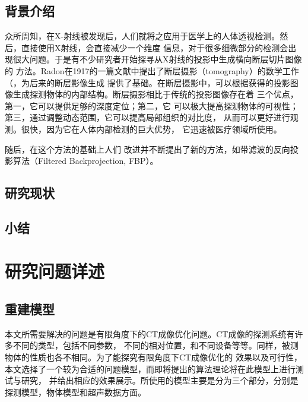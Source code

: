 \section{背景介绍}
众所周知，在X-射线被发现后，人们就将之应用于医学上的人体透视检测。然后，直接使用X射线，会直接减少一个维度
信息，对于很多细微部分的检测会出现很大问题。于是有不少研究者开始探寻从X射线的投影中生成横向断层切片图像的
方法。Radon在1917的一篇文献中提出了断层摄影（tomography）的数学工作（\cite{radon1986}，为后来的断层影像生成
提供了基础。在断层摄影中，可以根据获得的投影图像生成探测物体的内部结构。断层摄影相比于传统的投影图像存在着
三个优点，第一，它可以提供足够的深度定位；第二，它
可以极大提高探测物体的可视性；第三，通过调整动态范围，它可以提高局部组织的对比度，
从而可以更好进行观测。很快，因为它在人体内部检测的巨大优势，
它迅速被医疗领域所使用\cite{dobbins2003digital}。

随后，在这个方法的基础上人们
改进并不断提出了新的方法，如带滤波的反向投影算法（Filtered Backprojection, FBP）\cite{kak1979computerized}。
\section{研究现状}
\section{小结}



\chapter{研究问题详述}
\section{重建模型}
本文所需要解决的问题是有限角度下的CT成像优化问题。CT成像的探测系统有许多不同的类型，包括不同参数，
不同的相对位置，和不同设备等等。同样，被测物体的性质也各不相同。为了能探究有限角度下CT成像优化的
效果以及可行性，本文选择了一个较为合适的问题模型，而即将提出的算法理论将在此模型上进行测试与研究，
并给出相应的效果展示。所使用的模型主要是分为三个部分，分别是探测模型，物体模型和超声数据方面。
